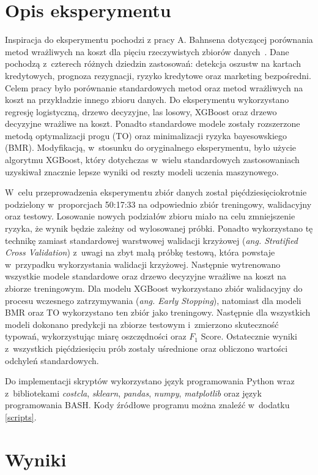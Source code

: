 \documentclass[inzynierska]{pwr_wmat_praca_dyplomowa}
\theoremstyle{plain}
\numberwithin{theorem}{chapter}
\theoremstyle{definition}
\numberwithin{theorem}{chapter}
\begin{document}
\section{Opis eksperymentu}
Inspiracja do eksperymentu pochodzi z pracy A. Bahnsena dotyczącej porównania metod wrażliwych na koszt dla pięciu rzeczywistych zbiorów danych~\cite{alej2015ensemble}. Dane pochodzą z~czterech różnych dziedzin zastosowań: detekcja oszustw na kartach kredytowych, prognoza rezygnacji, ryzyko kredytowe oraz marketing bezpośredni. Celem pracy było porównanie standardowych metod oraz metod wrażliwych na koszt na przykładzie innego zbioru danych. Do eksperymentu wykorzystano regresję logistyczną, drzewo decyzyjne, las losowy, XGBoost oraz drzewo decyzyjne wrażliwe na koszt. Ponadto standardowe modele zostały rozszerzone metodą optymalizacji progu (TO) oraz minimalizacji ryzyka bayesowskiego (BMR). Modyfikacją, w~stosunku do oryginalnego eksperymentu, było użycie algorytmu XGBoost, który dotychczas w~wielu standardowych zastosowaniach uzyskiwał znacznie lepsze wyniki od reszty modeli uczenia maszynowego.

W~celu przeprowadzenia eksperymentu zbiór danych został pięćdziesięciokrotnie podzielony w~proporcjach 50:17:33 na odpowiednio zbiór treningowy, walidacyjny oraz testowy. Losowanie nowych podziałów zbioru miało na celu zmniejszenie ryzyka, że wynik będzie zależny od wylosowanej próbki. Ponadto wykorzystano tę technikę zamiast standardowej warstwowej walidacji krzyżowej (\textit{ang. Stratified Cross Validation}) z~uwagi na zbyt małą próbkę testową, która powstaje w~przypadku wykorzystania walidacji krzyżowej. Następnie wytrenowano wszystkie modele standardowe oraz drzewo decyzyjne wrażliwe na koszt na zbiorze treningowym. Dla modelu XGBoost wykorzystano zbiór walidacyjny do procesu wczesnego zatrzymywania (\textit{ang. Early Stopping}), natomiast dla modeli BMR oraz TO wykorzystano ten zbiór jako treningowy. Następnie dla wszystkich modeli dokonano predykcji na zbiorze testowym i~zmierzono skuteczność typowań, wykorzystując miarę oszczędności oraz $F_1$ Score. Ostatecznie wyniki z~wszystkich pięćdziesięciu prób zostały uśrednione oraz obliczono wartości odchyleń standardowych.

Do implementacji skryptów wykorzystano język programowania Python wraz z~bibliotekami \textit{costcla}, \textit{sklearn}, \textit{pandas}, \textit{numpy}, \textit{matplotlib} oraz język programowania BASH. Kody źródłowe programu można znaleźć w~dodatku \ref{scripts}.

\section{Wyniki}
\end{document}
